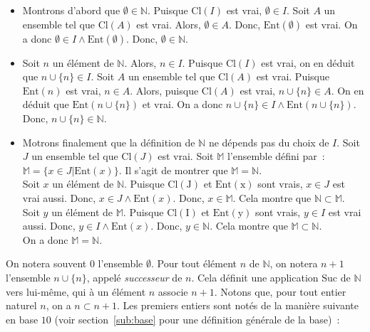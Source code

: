 \begin{itemize}[nosep]
    \item Montrons d'abord que $\emptyset \in \mathbb{N}$. 
        Puisque $\mathrm{Cl}(I)$ est vrai, $\emptyset \in I$.
        Soit $A$ un ensemble tel que $\mathrm{Cl}(A)$ est vrai.
        Alors, $\emptyset \in A$.
        Donc, $\mathrm{Ent}(\emptyset)$ est vrai. 
        On a donc $\emptyset \in I \wedge \mathrm{Ent}(\emptyset)$. 
        Donc, $\emptyset \in \mathbb{N}$.
    \item Soit $n$ un élément de $\mathbb{N}$. 
        Alors, $n \in I$.
        Puisque $\mathrm{Cl}(I)$ est vrai, on en déduit que $n \cup \lbrace n \rbrace \in I$.
        Soit $A$ un ensemble tel que $\mathrm{Cl}(A)$ est vrai.
        Puisque $\mathrm{Ent}(n)$ est vrai, $n \in A$.
        Alors, puisque $\mathrm{Cl}(A)$ est vrai, $n  \cup \lbrace n \rbrace \in A$.
        On en déduit que $\mathrm{Ent}(n  \cup \lbrace n \rbrace)$ et vrai. 
        On a donc $n  \cup \lbrace n \rbrace \in I \wedge \mathrm{Ent}(n  \cup \lbrace n \rbrace)$. 
        Donc, $n  \cup \lbrace n \rbrace \in \mathbb{N}$.
    \item Motrons finalement que la définition de $\mathbb{N}$ ne dépends pas du choix de $I$. 
        Soit $J$ un ensemble tel que $\mathrm{Cl}(J)$ est vrai.
        Soit $\mathbb{M}$ l'ensemble défini par : $\mathbb{M} = \lbrace x \in J \vert \mathrm{Ent}(x) \rbrace$. 
        Il s'agit de montrer que $\mathbb{M} = \mathbb{N}$. \\
        Soit $x$ un élément de $\mathbb{N}$. 
        Puisque $\mathrm{Cl(J)}$ et $\mathrm{Ent(x)}$ sont vrais, $x \in J$ est vrai aussi. 
        Donc, $x \in J \wedge \mathrm{Ent}(x)$. 
        Donc, $x \in \mathbb{M}$. 
        Cela montre que $\mathbb{N} \subset \mathbb{M}$. \\
        Soit $y$ un élément de $\mathbb{M}$. 
        Puisque $\mathrm{Cl(I)}$ et $\mathrm{Ent(y)}$ sont vrais, $y \in I$ est vrai aussi. 
        Donc, $y \in I \wedge \mathrm{Ent}(x)$. 
        Donc, $y \in \mathbb{N}$. 
        Cela montre que $\mathbb{M} \subset \mathbb{N}$. \\
        On a donc $\mathbb{M} = \mathbb{N}$.
\end{itemize}

\done

\medskip

On notera souvent $0$ l'ensemble $\emptyset$. 
Pour tout élément $n$ de $\mathbb{N}$, on notera $n+1$ l'ensemble $n \cup \lbrace n \rbrace$, appelé \textit{successeur} de $n$. 
Cela définit une application $\mathrm{Suc}$ de $\mathbb{N}$ vers lui-même, qui à un élément $n$ associe $n+1$. 
Notons que, pour tout entier naturel $n$, on a $n \subset n+1$.
Les premiers entiers sont notés de la manière suivante en base $10$ (voir section~\ref{sub:base} pour une définition générale de la base) : 

